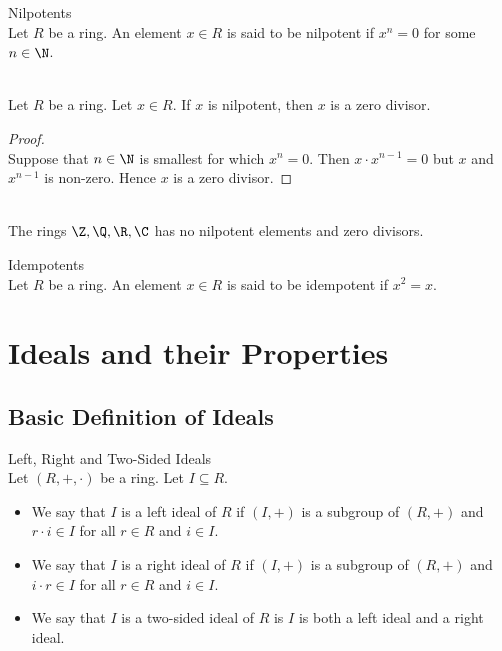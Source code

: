 \documentclass[a4paper]{article}
\begin{document}
\begin{defn}{Nilpotents}{}\\
Let $R$ be a ring. An element $x\in R$ is said to be nilpotent if $x^n=0$ for some $n\in\N$. 
\end{defn}

\begin{lmm}{}{}\\
Let $R$ be a ring. Let $x\in R$. If $x$ is nilpotent, then $x$ is a zero divisor. 
\begin{proof}\\
Suppose that $n\in\N$ is smallest for which $x^n=0$. Then $x\cdot x^{n-1}=0$ but $x$ and $x^{n-1}$ is non-zero. Hence $x$ is a zero divisor. 
\end{proof}
\end{lmm}

\begin{eg}{}{}\\
The rings $\Z,\Q,\R,\C$ has no nilpotent elements and zero divisors. 
\end{eg}

\begin{defn}{Idempotents}{}\\
Let $R$ be a ring. An element $x\in R$ is said to be idempotent if $x^2=x$. 
\end{defn}

\pagebreak
\section{Ideals and their Properties}
\subsection{Basic Definition of Ideals}
\begin{defn}{Left, Right and Two-Sided Ideals}{}\\
Let $(R,+,\cdot)$ be a ring. Let $I\subseteq R$. 
\begin{itemize}
\item We say that $I$ is a left ideal of $R$ if $(I,+)$ is a subgroup of $(R,+)$ and $r\cdot i\in I$ for all $r\in R$ and $i\in I$. 
\item We say that $I$ is a right ideal of $R$ if $(I,+)$ is a subgroup of $(R,+)$ and $i\cdot r\in I$ for all $r\in R$ and $i\in I$. 
\item We say that $I$ is a two-sided ideal of $R$ is $I$ is both a left ideal and a right ideal. 
\end{itemize}
\end{defn}
\end{document}
